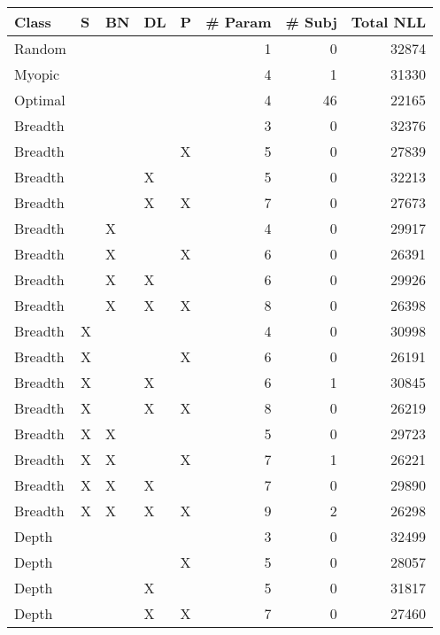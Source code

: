 \begin{tabular}{lllllrrr}
\toprule
   Class &  S & BN & DL &  P &  \# Param &  \# Subj &  Total NLL \\
\midrule
  Random &    &    &    &    &        1 &       0 &      32874 \\
  Myopic &    &    &    &    &        4 &       1 &      31330 \\
 Optimal &    &    &    &    &        4 &      46 &      22165 \\
 Breadth &    &    &    &    &        3 &       0 &      32376 \\
 Breadth &    &    &    &  X &        5 &       0 &      27839 \\
 Breadth &    &    &  X &    &        5 &       0 &      32213 \\
 Breadth &    &    &  X &  X &        7 &       0 &      27673 \\
 Breadth &    &  X &    &    &        4 &       0 &      29917 \\
 Breadth &    &  X &    &  X &        6 &       0 &      26391 \\
 Breadth &    &  X &  X &    &        6 &       0 &      29926 \\
 Breadth &    &  X &  X &  X &        8 &       0 &      26398 \\
 Breadth &  X &    &    &    &        4 &       0 &      30998 \\
 Breadth &  X &    &    &  X &        6 &       0 &      26191 \\
 Breadth &  X &    &  X &    &        6 &       1 &      30845 \\
 Breadth &  X &    &  X &  X &        8 &       0 &      26219 \\
 Breadth &  X &  X &    &    &        5 &       0 &      29723 \\
 Breadth &  X &  X &    &  X &        7 &       1 &      26221 \\
 Breadth &  X &  X &  X &    &        7 &       0 &      29890 \\
 Breadth &  X &  X &  X &  X &        9 &       2 &      26298 \\
   Depth &    &    &    &    &        3 &       0 &      32499 \\
   Depth &    &    &    &  X &        5 &       0 &      28057 \\
   Depth &    &    &  X &    &        5 &       0 &      31817 \\
   Depth &    &    &  X &  X &        7 &       0 &      27460 \\

\end{tabular}
